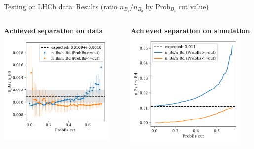 \documentclass[aspectratio=1610, 10pt]{beamer}
\begin{document}
\begin{frame}{Testing on LHCb data: Results (ratio $n_{B_s}/n_{B_d}$ by $\text{Prob}_{B_s}$ cut value)}
  \begin{columns}
    \begin{column}{0.5\textwidth}
      \centering
      \textbf{Achieved separation on data}
      \includegraphics[width=0.9\textwidth]{images/ratio_data.pdf}
    \end{column}
    \begin{column}{0.5\textwidth}
      \centering
      \textbf{Achieved separation on simulation}
      \includegraphics[width=0.9\textwidth]{images/ratio_mc.pdf}
    \end{column}
  \end{columns}
\end{frame}
\end{document}
